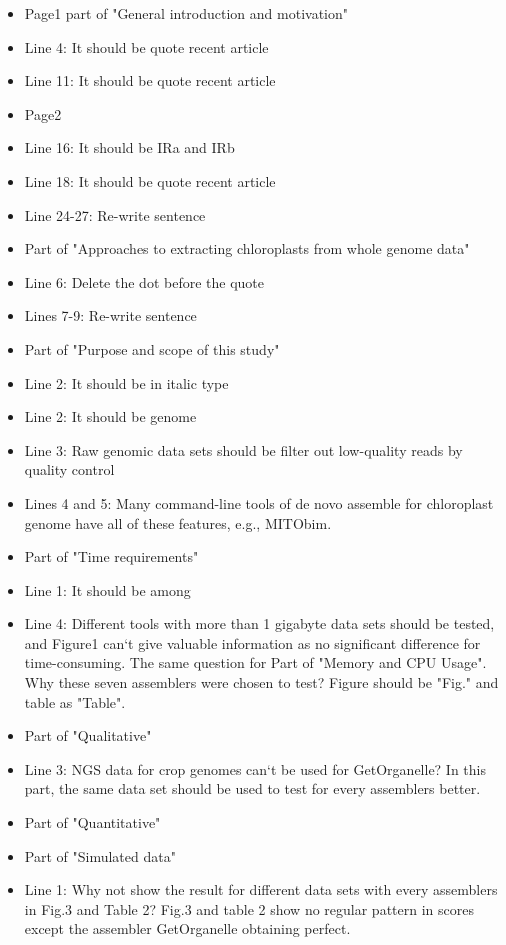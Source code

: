 \documentclass[a4paper,10pt]{scrartcl}
\begin{document}
\begin{itemize}
    \item Page1  part of "General introduction and motivation"
    \item Line 4: It should be quote recent article
    \item Line 11: It should be quote recent article
    \item Page2
    \item Line 16: It should be IRa and IRb
    \item Line 18: It should be quote recent article
    \item Line 24-27: Re-write sentence
    \item Part of "Approaches to extracting chloroplasts from whole genome data"
    \item Line 6: Delete the dot before the quote
    \item Lines 7-9: Re-write sentence
    \item Part of "Purpose and scope of this study"
    \item Line 2: It should be in italic type
    \item Line 2: It should be genome
    \item Line 3: Raw genomic data sets should be filter out low-quality reads by quality control
    \item Lines 4 and 5: Many command-line tools of de novo assemble for chloroplast genome have all of these features, e.g., MITObim.
    \item Part of "Time requirements"
    \item Line 1: It should be among
    \item Line 4: Different tools with more than 1 gigabyte data sets should be tested, and Figure1 can`t give valuable information as no significant difference for time-consuming. The same question for Part of "Memory and CPU Usage". Why these seven assemblers were chosen to test? Figure should be "Fig." and table as "Table".
    \item Part of "Qualitative"
    \item Line 3: NGS data for crop genomes can`t be used for GetOrganelle? In this part, the same data set should be used to test for every assemblers better.
    \item Part of "Quantitative"  
    \item Part of "Simulated data"
    \item Line 1: Why not show the result for different data sets with every assemblers in Fig.3 and Table 2? Fig.3 and table 2 show no regular pattern in scores except the assembler GetOrganelle obtaining perfect.

\end{itemize}
\end{document}
